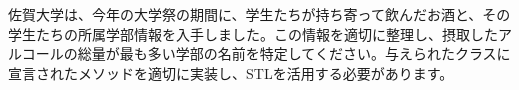 佐賀大学は、今年の大学祭の期間に、学生たちが持ち寄って飲んだお酒と、その学生たちの所属学部情報を入手しました。この情報を適切に整理し、摂取したアルコールの総量が最も多い学部の名前を特定してください。与えられたクラスに宣言されたメソッドを適切に実装し、STLを活用する必要があります。
